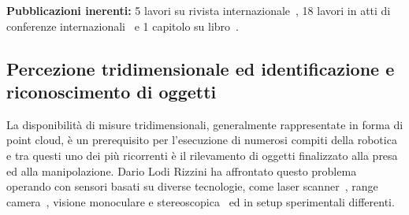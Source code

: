\documentclass[11pt]{article}
\begin{document}
\textbf{Pubblicazioni inerenti:}
5 lavori su rivista internazionale~\cite{lodirizzini2022ral,lodirizzini2019ral, lodirizzini2018pr, kallasi2016ral, lodirizzini2009ras},
18 lavori in atti di conferenze internazionali~\cite{
khan2022irc, khan2021iccp, lodirizzini2018irosws, lodirizzini2017iros, kallasi2016iros, lodirizzini2013ecmr, lodirizzini2011icra, lodirizzini2010iros, lodirizzini2009iros, lodirizzini2009ecmr, lodirizzini2009icar, grisetti2008icra, lodirizzini2008ciras, lodirizzini2007ecmr, lodirizzini2007icinco, khan2020irim, lodirizzini2012icraworkshop, lodirizzini2010graphbot} e 1 capitolo su libro~\cite{lodirizzini2008improved}.

\subsection*{Percezione tridimensionale ed identificazione e riconoscimento di oggetti}

La disponibilit\`a di misure tridimensionali, generalmente rappresentate in forma di point cloud, \`e un prerequisito per l'esecuzione 
di numerosi compiti della robotica e tra questi uno dei pi\`u ricorrenti \`e il rilevamento di oggetti finalizzato alla presa ed alla manipolazione. 
Dario Lodi Rizzini ha affrontato questo problema operando con sensori basati su diverse tecnologie, come laser scanner~\cite{aleotti2014jirs,aleotti2012icra},
range camera~\cite{aleotti2021ap, fontana2021ecmr, fontana2021iccp, monica2020irc, chiaravalli2020etfa, aleotti2014iros, lodirizzini2014ias}, visione monoculare e stereoscopica~\cite{lodirizzini2017caee, lodirizzini2015ijars,
oleari2014ifac, oleari2013iccp} ed in setup sperimentali differenti.
\end{document}
